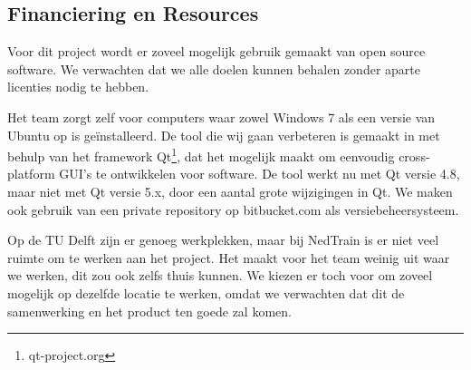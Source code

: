 \subsection{Financiering en Resources}
Voor dit project wordt er zoveel mogelijk gebruik gemaakt van open source software. We verwachten dat we alle doelen kunnen behalen zonder aparte licenties nodig te hebben.

Het team zorgt zelf voor computers waar zowel Windows 7 als een versie van Ubuntu op is ge\"installeerd. De tool die wij gaan verbeteren is gemaakt in \cpp met behulp van het framework Qt\footnote{qt-project.org}, dat het mogelijk maakt om eenvoudig cross-platform GUI's te ontwikkelen voor \cpp software. De tool werkt nu met Qt versie 4.8, maar niet met Qt versie 5.x, door een aantal grote wijzigingen in Qt. We maken ook gebruik van een private repository op bitbucket.com als versiebeheersysteem.

Op de TU Delft zijn er genoeg werkplekken, maar bij NedTrain is er niet veel ruimte om te werken aan het project. Het maakt voor het team weinig uit waar we werken, dit zou ook zelfs thuis kunnen. We kiezen er toch voor om zoveel mogelijk op dezelfde locatie te werken, omdat we verwachten dat dit de samenwerking en het product ten goede zal komen. 
